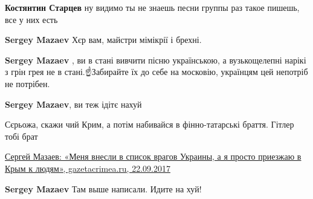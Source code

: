 \begin{itemize}
\begin{itemize}
\textbf{Костянтин Старцев} ну видимо ты не знаешь песни группы раз такое пишешь, все у них есть
\end{itemize}

 
\textbf{Sergey Mazaev} Хєр вам, майстри мімікрії і брехні.

 
\textbf{Sergey Mazaev} , ви в стані вивчити пісню українською, а вузькощелепні нарікі з грін грея не в стані.☝️Забирайте їх до себе на московію, українцям цей непотріб не потрібен.

 
\textbf{Sergey Mazaev}, ви теж ідітє нахуй

 
Сєрьожа, скажи чий Крим, а потім набивайся в фінно-татарські браття. Гітлер тобі брат

\href{https://gazetacrimea.ru/news/sergei-mazaev-menya-vnesli-v-spisok-vragov-ykraini-a-ya-prosto-priezjau-v-krim-k-ludyam-27172/}{%
Сергей Мазаев: «Меня внесли в список врагов Украины, а я просто приезжаю в Крым к людям», gazetacrimea.ru, 22.09.2017%
}

 
\textbf{Sergey Mazaev} Там выше написали. Идите на хуй!


\end{itemize}
